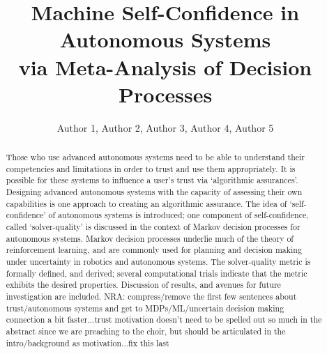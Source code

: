 \documentclass[sigconf,authordraft]{acmart}
\newcommand{\hlr}[1]{{\color{red} #1}}
\newcommand{\nisar}[1]{\hlr{NRA: #1}}
\begin{document}
\title{Machine Self-Confidence in Autonomous Systems \\ via  Meta-Analysis of Decision Processes}%
\author{Author 1, Author 2, Author 3, Author 4, Author 5} %
\begin{abstract}
    Those who use advanced autonomous systems need to be able to understand their competencies and limitations in order to trust and use them appropriately. It is possible for these systems to influence a user's trust via `algorithmic assurances'. Designing advanced autonomous systems with the capacity of assessing their own capabilities is one approach to creating an algorithmic assurance. The idea of `self-confidence' of autonomous systems is introduced; one component of self-confidence, called `solver-quality' is discussed in the context of Markov decision processes for autonomous systems. Markov decision processes underlie much of the theory of reinforcement learning, and are commonly used for planning and decision making under uncertainty in robotics and autonomous systems. The solver-quality metric is formally defined, and derived; several computational trials indicate that the metric exhibits the desired properties. Discussion of results, and avenues for future investigation are included. \nisar{compress/remove the first few sentences about trust/autonomous systems and get to MDPs/ML/uncertain decision making connection a bit faster...trust motivation doesn't need to be spelled out so much in the abstract since we are preaching to the choir, but should be articulated in the intro/background as motivation...fix this last}
\end{abstract}
\maketitle









\newpage

\end{document}
